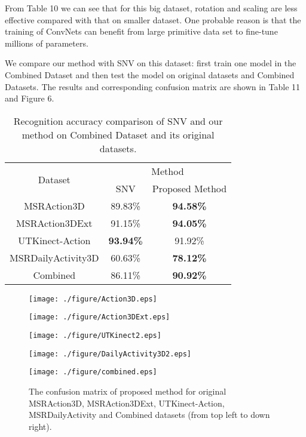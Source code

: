 \documentclass[conference]{IEEEtran}
\begin{document}
From Table 10 we can see that for this big dataset, rotation and scaling are less effective compared with that on smaller dataset. One probable reason is that the training of ConvNets can benefit from large primitive data set to fine-tune millions of parameters.

We compare our method with SNV \cite{yangsuper} on this dataset: first train one model in the Combined Dataset and then test the model on original datasets and Combined Datasets. The results and corresponding confusion matrix are shown in Table 11 and Figure 6.
\begin{table}[h]
\centering
\caption{Recognition accuracy comparison of SNV and our method on Combined Dataset and its original datasets.}
\begin{tabular}{|c|c|c|} \hline
\multirow{2}{*}{Dataset}
& \multicolumn{2}{c|}{Method}\\
 \cline{2-3}
 & SNV  & Proposed Method \\ \hline
  MSRAction3D & 89.83\%  & \textbf{94.58\%} \\ \hline
  MSRAction3DExt & 91.15\%  & \textbf{94.05\%} \\ \hline
  UTKinect-Action & \textbf{93.94\%}  & 91.92\% \\ \hline
  MSRDailyActivity3D &60.63\%  & \textbf{78.12\%}  \\ \hline
  Combined  & 86.11\% &   \textbf{90.92\%}  \\ \hline
\end{tabular}
\end{table}

\begin{figure}
\begin{minipage}[t]{0.5\linewidth}
\centering
\texttt{[image: ./figure/Action3D.eps]}
\label{fig:side:a}
\end{minipage}%
\begin{minipage}[t]{0.5\linewidth}
\centering
\texttt{[image: ./figure/Action3DExt.eps]}
\label{fig:side:b}
\end{minipage}
\begin{minipage}[t]{0.5\linewidth}
\centering
\texttt{[image: ./figure/UTKinect2.eps]}
\label{fig:side:a}
\end{minipage}%
\begin{minipage}[t]{0.5\linewidth}
\centering
\texttt{[image: ./figure/DailyActivity3D2.eps]}
\label{fig:side:b}
\end{minipage}
\begin{minipage}[t]{1\linewidth}
\centering
\texttt{[image: ./figure/combined.eps]}
\label{fig:side:b}
\end{minipage}
\caption{The confusion matrix of proposed method for original MSRAction3D, MSRAction3DExt, UTKinect-Action, MSRDailyActivity and Combined datasets (from top left to down right).}
\end{figure}
\end{document}
